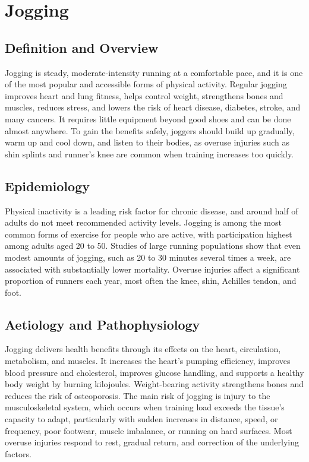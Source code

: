 \chapter{Jogging}

\section*{Definition and Overview}
Jogging is steady, moderate-intensity running at a comfortable pace, and it is one of the most popular and accessible forms of physical activity. Regular jogging improves heart and lung fitness, helps control weight, strengthens bones and muscles, reduces stress, and lowers the risk of heart disease, diabetes, stroke, and many cancers. It requires little equipment beyond good shoes and can be done almost anywhere. To gain the benefits safely, joggers should build up gradually, warm up and cool down, and listen to their bodies, as overuse injuries such as shin splints and runner's knee are common when training increases too quickly.

\section*{Epidemiology}
Physical inactivity is a leading risk factor for chronic disease, and around half of adults do not meet recommended activity levels. Jogging is among the most common forms of exercise for people who are active, with participation highest among adults aged 20 to 50. Studies of large running populations show that even modest amounts of jogging, such as 20 to 30 minutes several times a week, are associated with substantially lower mortality. Overuse injuries affect a significant proportion of runners each year, most often the knee, shin, Achilles tendon, and foot.

\section*{Aetiology and Pathophysiology}
Jogging delivers health benefits through its effects on the heart, circulation, metabolism, and muscles. It increases the heart's pumping efficiency, improves blood pressure and cholesterol, improves glucose handling, and supports a healthy body weight by burning kilojoules. Weight-bearing activity strengthens bones and reduces the risk of osteoporosis. The main risk of jogging is injury to the musculoskeletal system, which occurs when training load exceeds the tissue's capacity to adapt, particularly with sudden increases in distance, speed, or frequency, poor footwear, muscle imbalance, or running on hard surfaces. Most overuse injuries respond to rest, gradual return, and correction of the underlying factors.

